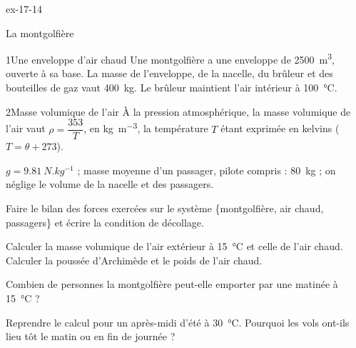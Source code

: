 \begin{blocLivre}{ex-17-14}
\begin{exercice}[3]{La montgolfière}
\begin{docu}{1}{Une enveloppe d'air chaud}
Une montgolfière a une enveloppe de \qty{2500}{m^3}, ouverte à sa base. La masse de l'enveloppe, de la nacelle, du
brûleur et des bouteilles de gaz vaut \qty{400}{kg}. Le brûleur maintient l'air intérieur à \qty{100}{\degreeCelsius}.
\end{docu}
\begin{docu}{2}{Masse volumique de l'air}
À la pression atmosphérique, la masse volumique de l'air vaut $\rho=\dfrac{353}{T}$, en \unit{kg.m^{-3}}, la température $T$
étant exprimée en kelvins ($T=\theta+273$).
\end{docu}
\begin{donnees}
$g=\qty{9,81}{N.kg^{-1}}$ ; masse moyenne d'un passager, pilote compris : \qty{80}{kg} ; on néglige le volume de la
nacelle et des passagers.
\end{donnees}
\begin{questions}
\item Faire le bilan des forces exercées sur le système \{montgolfière, air chaud, passagers\} et écrire la condition de
décollage.
\item Calculer la masse volumique de l'air extérieur à \qty{15}{\degreeCelsius} et celle de l'air chaud. Calculer la poussée
d'Archimède et le poids de l'air chaud.
\item \initiative Combien de personnes la montgolfière peut-elle emporter par une matinée à \qty{15}{\degreeCelsius} ?
\item Reprendre le calcul pour un après-midi d'été à \qty{30}{\degreeCelsius}. Pourquoi les vols ont-ils lieu tôt le matin
ou en fin de journée ?
\end{questions}
\end{exercice}
\end{blocLivre}
